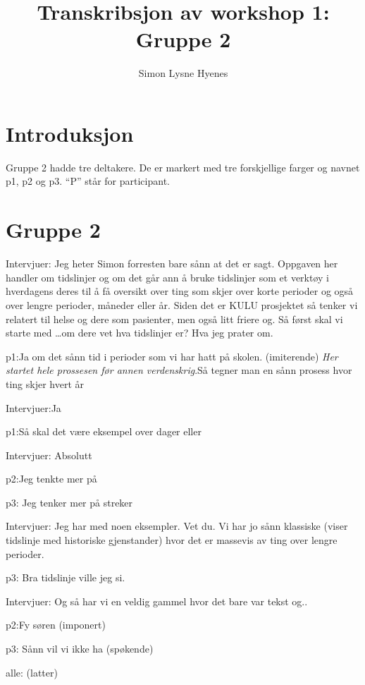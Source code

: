 \documentclass[11pt,UKenglish, a4paper]{article}
\author{Simon Lysne Hyenes}
\title{Transkribsjon av workshop 1: Gruppe 2}
\begin{document}
\maketitle{}
\section{Introduksjon}
Gruppe 2 hadde tre deltakere. De er markert med tre forskjellige farger og navnet p1, p2 og p3. ``P'' står for participant. 
\section{Gruppe 2}

\textcolor{myBlue} {Intervjuer:} Jeg heter Simon forresten bare sånn at det er sagt. Oppgaven her handler om tidslinjer og om det går ann å bruke tidslinjer som et verktøy i hverdagens deres til å få oversikt over ting som skjer over korte perioder og også over lengre perioder, måneder eller år. Siden det er KULU prosjektet så tenker vi relatert til helse og dere som pasienter, men også litt friere og. Så først skal vi starte med \dots om dere vet hva tidslinjer er? Hva jeg prater om.

\textcolor{myGreen} {p1:}Ja om det sånn tid i perioder som vi har hatt på skolen. (imiterende) \textit{Her startet hele prossesen før annen verdenskrig}.Så tegner man en sånn prosess hvor ting skjer hvert år

\textcolor{myBlue} {Intervjuer:}Ja

\textcolor{myGreen} {p1:}Så skal det være eksempel over dager eller

\textcolor{myBlue} {Intervjuer:} Absolutt

\textcolor{myYellow} {p2:}Jeg tenkte mer på

\textcolor{myR} {p3:} Jeg tenker mer på streker

\textcolor{myBlue} {Intervjuer:} Jeg har med noen eksempler. Vet du. Vi har jo sånn klassiske (viser tidslinje med historiske gjenstander) hvor det er massevis av ting over lengre perioder.

\textcolor{myR} {p3:} Bra tidslinje ville jeg si.

\textcolor{myBlue} {Intervjuer:} Og så har vi en veldig gammel hvor det bare var tekst og..

\textcolor{myYellow} {p2:}Fy søren (imponert)

\textcolor{myR} {p3:} Sånn vil vi ikke ha (spøkende)

alle: (latter)
\end{document}
